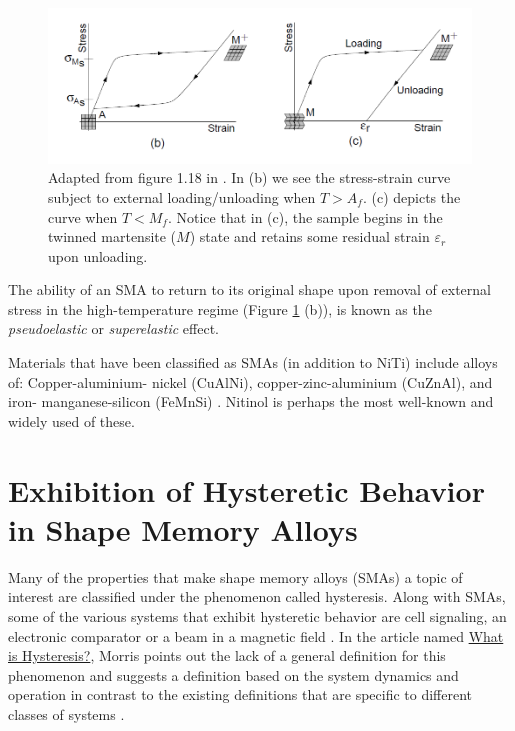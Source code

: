 \begin{multicols}{2}
\begin{figure}[H]
    \centering
    \includegraphics[scale=0.33]{._figures/Smith Fig1-18.png}
    \caption[Stress-strain curves subject to external loading for $T>A_f$]{Adapted from figure 1.18 in \cite{smith2005smart}. In (b) we see the stress-strain curve subject to external loading/unloading when $T > A_f$. (c) depicts the curve when $T < M_f$. Notice that in (c), the sample begins in the twinned martensite ($M$) state and retains some residual strain $\varepsilon_r$ upon unloading.}
    \label{fig:stress_strain}
\end{figure}

The ability of an SMA to return to its original shape upon removal of external stress in the high-temperature regime (Figure \ref{fig:stress_strain} (b)), is known as the \textit{pseudoelastic} or \textit{superelastic} effect.

Materials that have been classified as SMAs (in addition to NiTi) include alloys of: Copper-aluminium- nickel (CuAlNi), copper-zinc-aluminium (CuZnAl), and iron- manganese-silicon (FeMnSi) \cite{smith2005smart}. Nitinol is perhaps the most well-known and widely used of these.

\section{Exhibition of Hysteretic Behavior in Shape Memory Alloys}
Many of the properties that make shape memory alloys (SMAs) a topic of interest are classified under the phenomenon called hysteresis. Along with SMAs, some of the various systems that exhibit hysteretic behavior are cell signaling, an electronic comparator or a beam in a magnetic field \cite{morris2011hysteresis}. In the article named \underline{What is Hysteresis?}, Morris points out the lack of a general definition for this phenomenon and suggests a definition based on the system dynamics and operation in contrast to the existing definitions that are specific to different classes of systems \cite{morris2011hysteresis}. 


\end{multicols}
